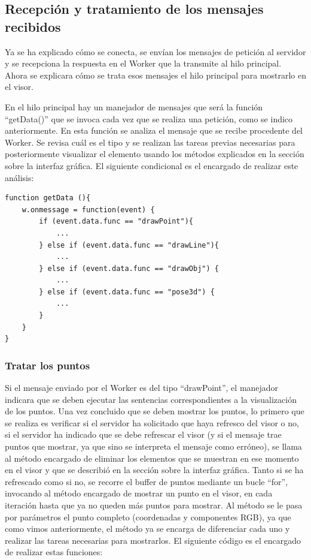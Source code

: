 \subsection{Recepción y tratamiento de los mensajes recibidos}
Ya se ha explicado cómo se conecta, se envían los mensajes de petición al servidor y se recepciona la respuesta en el Worker que la transmite al hilo principal. Ahora se explicara cómo se trata esos mensajes el hilo principal para mostrarlo en el visor.

En el hilo principal hay un manejador de mensajes que será la función ``getData()'' que se invoca cada vez que se realiza una petición, como se indico anteriormente. En esta función se analiza el mensaje que se recibe procedente del Worker. Se revisa cuál es el tipo y se realizan las tareas previas necesarias para posteriormente visualizar el elemento usando los métodos explicados en la sección sobre la interfaz gráfica. El siguiente condicional es el encargado de realizar este análisis:

\begin{lstlisting}[frame=single]
function getData (){
	w.onmessage = function(event) {
		if (event.data.func == "drawPoint"){
			...
		} else if (event.data.func == "drawLine"){
			...
		} else if (event.data.func == "drawObj") {
			...
		} else if (event.data.func == "pose3d") {
			...
		}
	}
}
\end{lstlisting}

\subsubsection{Tratar los puntos}
Si el mensaje enviado por el Worker es del tipo ``drawPoint'', el manejador indicara que se deben ejecutar las sentencias correspondientes a la visualización de los puntos. Una vez concluido que se deben mostrar los puntos, lo primero que se realiza es verificar si el servidor ha solicitado que haya refresco del visor o no, si el servidor ha indicado 	que se debe refrescar el visor (y si el mensaje trae puntos que mostrar, ya que sino se interpreta el mensaje como erróneo), se llama al método encargado de eliminar los elementos que se muestran en ese momento en el visor y que se describió en la sección sobre la interfaz gráfica. Tanto si se ha refrescado como si no, se recorre el buffer de puntos mediante un bucle ``for'', invocando al método encargado de mostrar un punto en el visor, en cada iteración hasta que ya no queden más puntos para mostrar. Al método se le pasa por parámetros el punto completo (coordenadas y componentes RGB), ya que como vimos anteriormente, el método ya se encarga de diferenciar cada uno y realizar las tareas necesarias para mostrarlos. El siguiente código es el encargado de realizar estas funciones:

